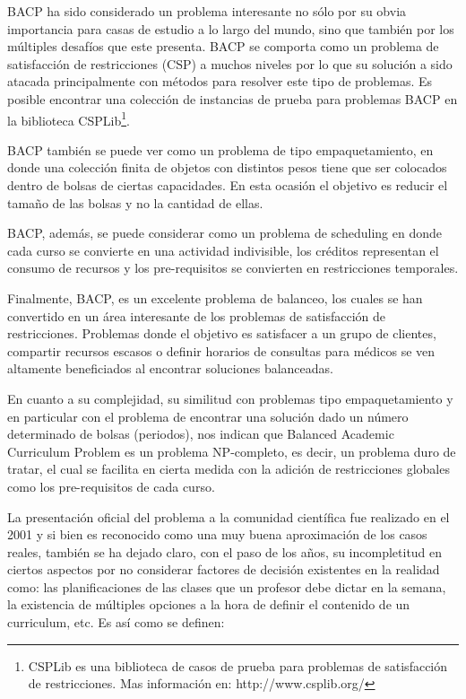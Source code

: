 \documentclass[letter, 10pt]{article}
\begin{document}
BACP ha sido considerado un problema interesante no sólo por su obvia
importancia para casas de estudio a lo largo del mundo, sino que también por los
múltiples desafíos que este presenta. BACP se comporta como un problema de
satisfacción de restricciones (CSP) a muchos niveles por lo que su solución a
sido atacada principalmente con métodos para resolver este tipo de
problemas\cite{castro2001variable}. Es posible encontrar una colección de
instancias de prueba para problemas BACP en la biblioteca CSPLib\footnote{CSPLib
  es una biblioteca de casos de prueba para problemas de satisfacción de
  restricciones. Mas información en: http://www.csplib.org/}.

BACP también se puede ver como un problema de tipo empaquetamiento, en donde una
colección finita de objetos con distintos pesos tiene que ser colocados dentro
de bolsas de ciertas capacidades. En esta ocasión el objetivo es reducir el
tamaño de las bolsas y no la cantidad de ellas.

BACP, además, se puede considerar como un problema de
scheduling\cite{pinedo2012scheduling} en donde cada curso se convierte en una
actividad indivisible, los créditos representan el consumo de recursos y los
pre-requisitos se convierten en restricciones temporales.

Finalmente, BACP, es un excelente problema de
balanceo\cite{schaus2007deviation}, los cuales se han convertido en un área
interesante de los problemas de satisfacción de restricciones. Problemas donde el
objetivo es satisfacer a un grupo de clientes, compartir recursos escasos o
definir horarios de consultas para médicos se ven altamente beneficiados al
encontrar soluciones balanceadas.

En cuanto a su complejidad, su similitud con problemas tipo empaquetamiento y en
particular con el problema de encontrar una solución dado un número determinado
de bolsas (periodos), nos indican que Balanced Academic Curriculum Problem es un
problema NP-completo, es decir, un problema duro de tratar, el cual se facilita
en cierta medida con la adición de restricciones globales como los
pre-requisitos de cada curso\cite{monette2007cp}.

La presentación oficial del problema a la comunidad científica fue realizado en
el 2001\cite{castro2001variable} y si bien es reconocido como una muy buena
aproximación de los casos reales, también se ha dejado claro, con el paso de los
años, su incompletitud en ciertos aspectos por no considerar factores de
decisión existentes en la realidad como: las planificaciones de las clases que
un profesor debe dictar en la semana\cite{schaerf1999survey}, la existencia de
múltiples opciones a la hora de definir el contenido de un curriculum, etc. Es
así como se definen:
\end{document}
